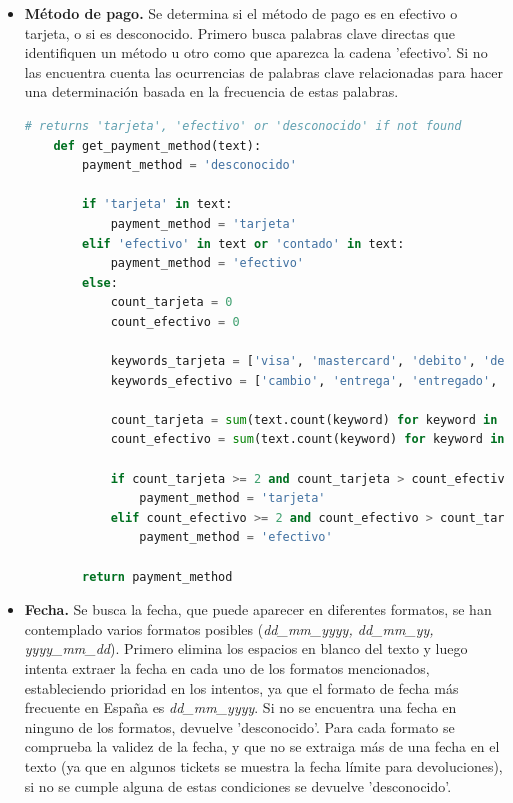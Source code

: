 \begin{itemize}
    \item \textbf{Método de pago.} Se determina si el método de pago es en efectivo o tarjeta, o si es desconocido. Primero busca palabras clave directas que identifiquen un método u otro como que aparezca la cadena 'efectivo'. Si no las encuentra cuenta las ocurrencias de palabras clave relacionadas para hacer una determinación basada en la frecuencia de estas palabras.
    
    \begin{lstlisting}[language=Python, caption=Extracción del método de pago en un ticket]
    # returns 'tarjeta', 'efectivo' or 'desconocido' if not found
    def get_payment_method(text):
        payment_method = 'desconocido'
    
        if 'tarjeta' in text:
            payment_method = 'tarjeta'
        elif 'efectivo' in text or 'contado' in text:
            payment_method = 'efectivo'
        else:
            count_tarjeta = 0
            count_efectivo = 0
    
            keywords_tarjeta = ['visa', 'mastercard', 'debito', 'debit', 'credito', 'credit', 'contactless', 'nfc', 'cuenta','caixabank', 'bbva', 'trj', 'jeta', 'tarj', 'tanjeta']
            keywords_efectivo = ['cambio', 'entrega', 'entregado', 'efect', 'entr', 'cont']
    
            count_tarjeta = sum(text.count(keyword) for keyword in keywords_tarjeta)
            count_efectivo = sum(text.count(keyword) for keyword in keywords_efectivo)
    
            if count_tarjeta >= 2 and count_tarjeta > count_efectivo:
                payment_method = 'tarjeta'
            elif count_efectivo >= 2 and count_efectivo > count_tarjeta:
                payment_method = 'efectivo'
                
        return payment_method
    \end{lstlisting}

    \item \textbf{Fecha.} Se busca la fecha, que puede aparecer en diferentes formatos, se han contemplado varios formatos posibles (\textit{dd\_mm\_yyyy, dd\_mm\_yy, yyyy\_mm\_dd}). Primero elimina los espacios en blanco del texto y luego intenta extraer la fecha en cada uno de los formatos mencionados, estableciendo prioridad en los intentos, ya que el formato de fecha más frecuente en España es \textit{dd\_mm\_yyyy}. Si no se encuentra una fecha en ninguno de los formatos, devuelve 'desconocido'. Para cada formato se comprueba la validez de la fecha, y que no se extraiga más de una fecha en el texto (ya que en algunos tickets se muestra la fecha límite para devoluciones), si no se cumple alguna de estas condiciones se devuelve 'desconocido'.


\end{itemize}
